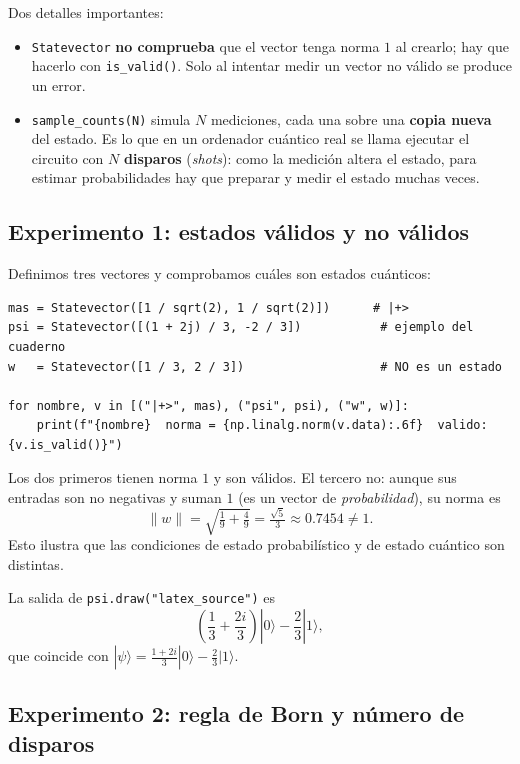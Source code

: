 \documentclass[11pt, a4paper, twoside, openright]{report}
\begin{document}
\noindent Dos detalles importantes:
\begin{itemize}
    \item \texttt{Statevector} \textbf{no comprueba} que el vector tenga norma $1$ al crearlo; hay que hacerlo con \texttt{is\_valid()}. Solo al intentar medir un vector no válido se produce un error.
    \item \texttt{sample\_counts(N)} simula $N$ mediciones, cada una sobre una \textbf{copia nueva} del estado. Es lo que en un ordenador cuántico real se llama ejecutar el circuito con $N$ \textbf{disparos} (\textit{shots}): como la medición altera el estado, para estimar probabilidades hay que preparar y medir el estado muchas veces.
\end{itemize}

\subsection{Experimento 1: estados válidos y no válidos}

\noindent Definimos tres vectores y comprobamos cuáles son estados cuánticos:
\begin{lstlisting}
mas = Statevector([1 / sqrt(2), 1 / sqrt(2)])      # |+>
psi = Statevector([(1 + 2j) / 3, -2 / 3])           # ejemplo del cuaderno
w   = Statevector([1 / 3, 2 / 3])                   # NO es un estado

for nombre, v in [("|+>", mas), ("psi", psi), ("w", w)]:
    print(f"{nombre}  norma = {np.linalg.norm(v.data):.6f}  valido: {v.is_valid()}")
\end{lstlisting}

\noindent Los dos primeros tienen norma $1$ y son válidos. El tercero no: aunque sus entradas son no negativas y suman $1$ (es un vector de \textit{probabilidad}), su norma es
\[ \|w\| = \sqrt{\tfrac19 + \tfrac49} = \tfrac{\sqrt 5}{3} \approx 0.7454 \neq 1. \]
Esto ilustra que las condiciones de estado probabilístico y de estado cuántico son distintas.

\noindent La salida de \texttt{psi.draw("latex\_source")} es
\[ \left(\frac{1}{3} + \frac{2 i}{3}\right) |0\rangle - \frac{2}{3} |1\rangle, \]
que coincide con $|\psi\rangle = \frac{1+2i}{3}|0\rangle - \frac23|1\rangle$.

\subsection{Experimento 2: regla de Born y número de disparos}
\end{document}
